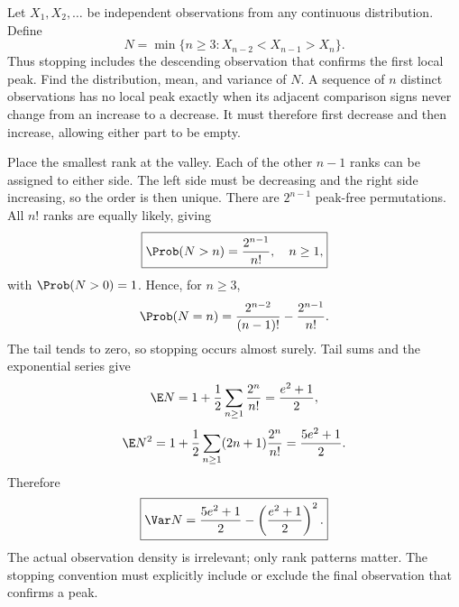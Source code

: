 Let $X_1,X_2,\ldots$ be independent observations from any continuous distribution. Define
\[
N=\min\{n\ge3:X_{n-2}<X_{n-1}>X_n\}.
\]
Thus stopping includes the descending observation that confirms the first local peak. Find the distribution, mean, and variance of $N$.
\solution A sequence of $n$ distinct observations has no local peak exactly when its adjacent comparison signs never change from an increase to a decrease. It must therefore first decrease and then increase, allowing either part to be empty.

Place the smallest rank at the valley. Each of the other $n-1$ ranks can be assigned to either side. The left side must be decreasing and the right side increasing, so the order is then unique. There are $2^{n-1}$ peak-free permutations. All $n!$ ranks are equally likely, giving
\[
\boxed{\Prob(N>n)=\frac{2^{n-1}}{n!},\quad n\ge1,}
\]
with $\Prob(N>0)=1$. Hence, for $n\ge3$,
\[
\Prob(N=n)=\frac{2^{n-2}}{(n-1)!}-\frac{2^{n-1}}{n!}.
\]
The tail tends to zero, so stopping occurs almost surely. Tail sums and the exponential series give
\[
\E N=1+\frac12\sum_{n\ge1}\frac{2^n}{n!}
=\frac{e^2+1}{2},
\]
\[
\E N^2=1+\frac12\sum_{n\ge1}(2n+1)\frac{2^n}{n!}
=\frac{5e^2+1}{2}.
\]
Therefore
\[
\boxed{\Var N=\frac{5e^2+1}{2}-\left(\frac{e^2+1}{2}\right)^2.}
\]
\insight The actual observation density is irrelevant; only rank patterns matter. The stopping convention must explicitly include or exclude the final observation that confirms a peak.
